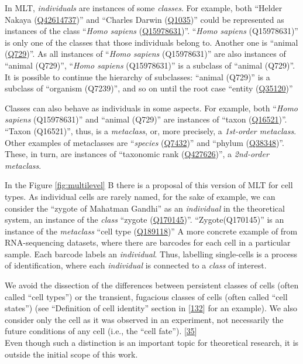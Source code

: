 In MLT, \emph{individuals} are instances of some \emph{classes}.
For example, both ``Helder Nakaya (\href{https://www.wikidata.org/wiki/Q42614737}{Q42614737})'' and ``Charles Darwin (\href{https://www.wikidata.org/wiki/Q42614737}{Q1035})'' could be represented as instances of the class ``\emph{Homo sapiens} (\href{https://www.wikidata.org/wiki/Q15978631}{Q15978631})''.
``\emph{Homo sapiens} (Q15978631)'' is only one of the classes that those individuals belong to.
Another one is ``animal (\href{https://www.wikidata.org/wiki/Q729}{Q729})''.
As all instances of ``\emph{Homo sapiens} (Q15978631)'' are also instances of ``animal (Q729)'', ``\emph{Homo sapiens} (Q15978631)'' is a subclass of ``animal (Q729)''.
It is possible to continue the hierarchy of subclasses: ``animal (Q729)'' is a subclass of ``organism (Q7239)'', and so on until the root case ``entity (\href{https://www.wikidata.org/wiki/Q35120}{Q35120})''

Classes can also behave as individuals in some aspects.
For example, both ``\emph{Homo sapiens} (Q15978631)'' and ``animal (Q729)'' are instances of ``taxon (\href{https://www.wikidata.org/wiki/Q16521}{Q16521})''.
``Taxon (Q16521)'', thus, is a \emph{metaclass}, or, more precisely, a \emph{1st-order metaclass}.
Other examples of metaclasses are ``\emph{species} (\href{https://www.wikidata.org/wiki/Q7432}{Q7432})'' and ``phylum (\href{https://www.wikidata.org/wiki/Q38348}{Q38348})''.
These, in turn, are instances of ``taxonomic rank (\href{https://www.wikidata.org/wiki/Q427626}{Q427626})'', a \emph{2nd-order metaclass}.

In the Figure \ref{fig:multilevel} B there is a proposal of this version of MLT for cell types.
As individual cells are rarely named, for the sake of example, we can consider the ``zygote of Mahatman Gandhi'' as an \emph{individual} in the theoretical system, an instance of the \emph{class} ``zygote (\href{https://www.wikidata.org/wiki/Q170145}{Q170145})''.
``Zygote(Q170145)'' is an instance of the \emph{metaclass} ``cell type (\href{https://www.wikidata.org/wiki/Q189118}{Q189118})''
A more concrete example of from RNA-sequencing datasets, where there are barcodes for each cell in a particular sample.
Each barcode labels an \emph{individual}.
Thus, labelling single-cells is a process of identification, where each \emph{individual} is connected to a \emph{class} of interest.

We avoid the dissection of the differences between persistent classes of cells (often called ``cell types'') or the transient, fugacious classes of cells (often called ``cell states'') (see ``Definition of cell identity'' section in {[}\protect\hyperlink{ref-pFijpXkl}{132}{]} for an example). We also consider only the cell as it was observed in an experiment, not necessarily the future conditions of any cell (i.e., the ``cell fate''). {[}\protect\hyperlink{ref-OjxQDZpx}{35}{]}\\
Even though such a distinction is an important topic for theoretical research, it is outside the initial scope of this work.

